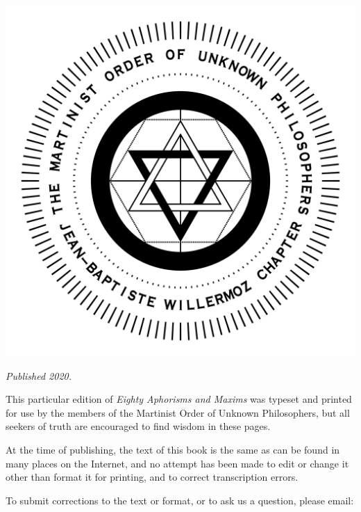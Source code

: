 \blankpage

\vspace*{\fill}

\begin{center}
	\includegraphics[width=\textwidth]{jbw_seal_2000px.png}\\\bigskip
	
	\textit{Published 2020.}
\end{center}

\vspace*{\fill}

\blankpage

\vspace*{\fill}
	
This particular edition of \textit{Eighty Aphorisms and Maxims} was typeset and printed for use by the members of the Martinist Order of Unknown Philosophers, but all seekers of truth are encouraged to find wisdom in these pages.

At the time of publishing, the text of this book is the same as can be found in many places on the Internet, and no attempt has been made to edit or change it other than format it for printing, and to correct transcription errors.

To submit corrections to the text or format, or to ask us a question, please email: 

